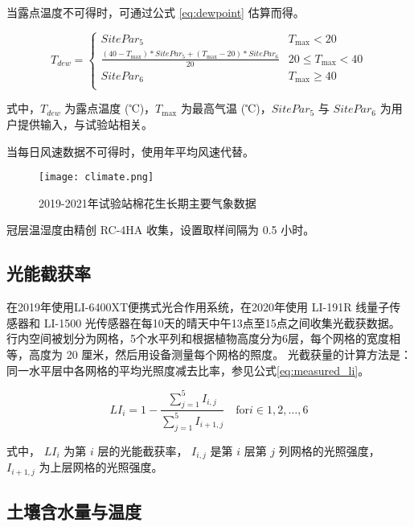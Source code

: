 当露点温度不可得时，可通过公式 \ref{eq:dewpoint} 估算而得。

\begin{equation}\label{eq:dewpoint}
    T_{dew} = \begin{cases}
        SitePar_5                                                            & T_{\max} < 20        \\
        \frac{(40 - T_{\max}) * SitePar_5 + (T_{\max} - 20) * SitePar_6}{20} & 20 \le T_{\max} < 40 \\
        SitePar_6                                                            & T_{\max} \ge 40      \\
    \end{cases}
\end{equation}

式中，$T_{dew}$ 为露点温度 (℃)，$T_{\max}$ 为最高气温 (℃)，$SitePar_5$ 与 $SitePar_6$ 为用户提供输入，与试验站相关。

当每日风速数据不可得时，使用年平均风速代替。

\begin{figure}
    \centering
    \texttt{[image: climate.png]}
    \caption{2019-2021年试验站棉花生长期主要气象数据}
\end{figure}

冠层温湿度由精创 RC-4HA 收集，设置取样间隔为 0.5 小时。

\subsection{光能截获率}

在2019年使用LI-6400XT便携式光合作用系统，在2020年使用 LI-191R 线量子传感器和 LI-1500 光传感器在每10天的晴天中午13点至15点之间收集光截获数据。
行内空间被划分为网格，5个水平列和根据植物高度分为6层，每个网格的宽度相等，高度为 20 厘米，然后用设备测量每个网格的照度。
光截获量的计算方法是：同一水平层中各网格的平均光照度减去比率，参见公式\ref{eq:measured_li}。

\begin{equation}\label{eq:measured_li}
    LI_{i} = 1 - \frac{\sum^5_{j=1} I_{i,j}}{\sum^5_{j=1} I_{i+1,j}} \quad \mathrm{for} i \in {1,2,\dots,6}
\end{equation}

式中， $LI_{i}$ 为第 $i$ 层的光能截获率， $I_{i,j}$ 是第 $i$ 层第 $j$ 列网格的光照强度， $I_{i+1,j}$ 为上层网格的光照强度。

\subsection{土壤含水量与温度}

